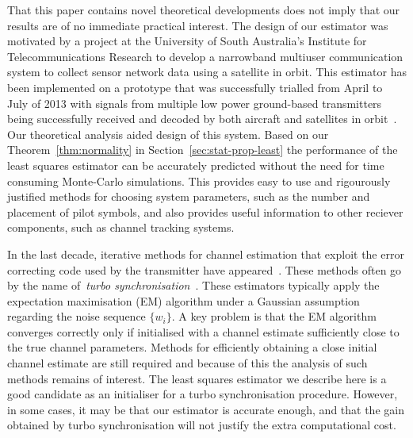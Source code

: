 \documentclass[journal]{IEEEtran}
\begin{document}
That this paper contains novel theoretical developments does not imply that our results are of no immediate practical interest.  The design of our estimator was motivated by a project at the University of South Australia's Institute for Telecommunications Research to develop a narrowband multiuser communication system to collect sensor network data using a satellite in orbit.  This estimator has been implemented on a prototype that was successfully trialled from April to July of 2013 with signals from multiple low power ground-based transmitters being successfully received and decoded by both aircraft and satellites in orbit~\cite{ASRPpromovideo}.  Our theoretical analysis aided design of this system.  Based on our Theorem~\ref{thm:normality} in Section~\ref{sec:stat-prop-least} the performance of the least squares estimator can be accurately predicted without the need for time consuming Monte-Carlo simulations.  This provides easy to use and rigourously justified methods for choosing system parameters, such as the number and placement of pilot symbols, and also provides useful information to other reciever components, such as channel tracking systems.

In the last decade, iterative methods for channel estimation that exploit the error correcting code used by the transmitter have appeared~\cite{Lottici2004,Noels2005,Herzet_turbo_synch_proc_IEEE_2007,Herzet_framework_turbo_sync_2007}.  These methods often go by the name of~\emph{turbo synchronisation}~\cite{Herzet_turbo_synch_proc_IEEE_2007}.  
These estimators typically apply the expectation maximisation (EM) algorithm under a Gaussian assumption regarding the noise sequence $\{w_i\}$.  A key problem is that the EM algorithm converges correctly only if initialised with a channel estimate sufficiently close to the true channel parameters.  Methods for efficiently obtaining a close initial channel estimate are still required and because of this the analysis of such methods remains of interest.  The least squares estimator we describe here is a good candidate as an initialiser for a turbo synchronisation procedure.  However, in some cases, it may be that our estimator is accurate enough, and that the gain obtained by turbo synchronisation will not justify the extra computational cost.
\end{document}
